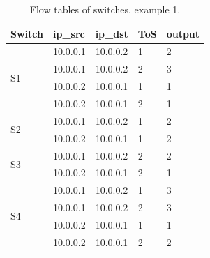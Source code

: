 \documentclass[10pt, journal, letterpaper]{IEEEtran}
\begin{document}
\begin{table}
\caption{Flow tables of switches, example 1.}\label{tab:flow_tables_example_1}
\centering
\begin{tabular}{|l|l|l|l|l|}
\hline
Switch              & ip\_src  & ip\_dst  & ToS & output \\ \hline
\multirow{4}{*}{S1} & 10.0.0.1 & 10.0.0.2 & 1   & 2      \\ \cline{2-5} 
                    & 10.0.0.1 & 10.0.0.2 & 2   & 3      \\ \cline{2-5} 
                    & 10.0.0.2 & 10.0.0.1 & 1   & 1      \\ \cline{2-5} 
                    & 10.0.0.2 & 10.0.0.1 & 2   & 1      \\ \hline
\multirow{2}{*}{S2} & 10.0.0.1 & 10.0.0.2 & 1   & 2      \\ \cline{2-5} 
                    & 10.0.0.2 & 10.0.0.1 & 1   & 2      \\ \hline
\multirow{2}{*}{S3} & 10.0.0.1 & 10.0.0.2 & 2   & 2      \\ \cline{2-5} 
                    & 10.0.0.2 & 10.0.0.1 & 2   & 1      \\ \hline
\multirow{4}{*}{S4} & 10.0.0.1 & 10.0.0.2 & 1   & 3      \\ \cline{2-5} 
                    & 10.0.0.1 & 10.0.0.2 & 2   & 3      \\ \cline{2-5} 
                    & 10.0.0.2 & 10.0.0.1 & 1   & 1      \\ \cline{2-5} 
                    & 10.0.0.2 & 10.0.0.1 & 2   & 2      \\ \hline
\end{tabular}
\end{table}
\end{document}
